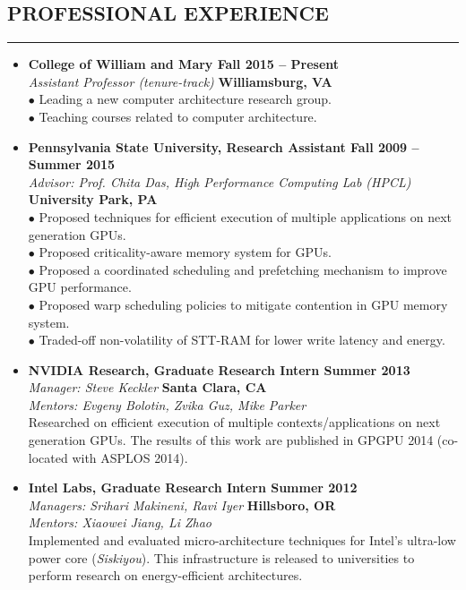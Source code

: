 \documentclass[10pt,a4]{article}
\begin{document}
\subsection*{PROFESSIONAL EXPERIENCE}
\hrule
\vspace{0.2cm}
\begin{itemize}

\item{\bf College of William and Mary \hfill {\bf Fall 2015 -- Present}} \\
{\it Assistant Professor (tenure-track) } \hfill {\bf Williamsburg, VA}\\
$\bullet$ Leading a new computer architecture research group. \\
$\bullet$ Teaching courses related to computer architecture. 

\item{\bf Pennsylvania State University, Research Assistant \hfill {\bf Fall 2009 -- Summer 2015}}\\
{\it Advisor: Prof. Chita Das, High Performance Computing Lab (HPCL)} \hfill {\bf University Park, PA}\\
$\bullet$ Proposed techniques for efficient execution of multiple applications on next generation GPUs.  \\ 
$\bullet$ Proposed criticality-aware memory system for GPUs. \\ 
$\bullet$ Proposed a coordinated scheduling and prefetching mechanism to improve GPU performance. \\
$\bullet$ Proposed warp scheduling policies to mitigate contention in GPU memory system. \\
$\bullet$ Traded-off non-volatility of STT-RAM for lower write latency and energy.

\item{\bf NVIDIA Research, Graduate Research Intern \hfill {\bf Summer 2013}} \\
{\it Manager: Steve Keckler}  \hfill {\bf Santa Clara, CA} \\ 
{\it Mentors: Evgeny Bolotin, Zvika Guz, Mike Parker}  \\
Researched on efficient execution of multiple contexts/applications on next generation GPUs.
The results of this work are published in GPGPU 2014 (co-located with ASPLOS 2014).

\item{\bf Intel Labs, Graduate Research Intern \hfill {\bf Summer 2012}} \\
{\it Managers: Srihari Makineni, Ravi Iyer}  \hfill {\bf Hillsboro, OR} \\ 
{\it Mentors: Xiaowei Jiang, Li Zhao}    \\
Implemented and evaluated micro-architecture techniques for Intel's ultra-low power core ({\it Siskiyou}).
This infrastructure is released to universities to perform research on energy-efficient architectures.


\end{itemize}
\end{document}
